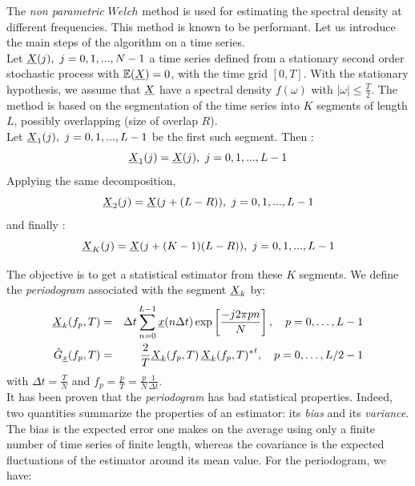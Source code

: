 The \emph{non parametric} $Welch$ method is used for estimating the spectral density at different frequencies. This method is known to be performant. Let us introduce the main steps of the algorithm on a time series. \\ 
Let ${\underline{X}}(j), \ j = 0, 1,...,N-1$ a time series defined from a stationary second order stochastic process with $\mathbb{E}({\underline{X}}) = 0$, with the time grid $[0, T]$.
With the stationary hypothesis, we assume that ${\underline{X}}$ have a spectral density $f(\omega)$ with $| \omega | \leq \frac{T}{2}$. 
The method is based on the segmentation of the time series into $K$ segments of length $L$, possibly overlapping (size of overlap $R$).\\
Let ${\underline{X}}_{1}(j), \ j = 0, 1,...,L-1$ be the first such segment. Then :
\begin{equation*}
{\underline{X}}_{1}(j) = {\underline{X}}(j) , \ j = 0, 1,...,L-1
\end{equation*}
Applying the same decomposition, 
\begin{equation*}
 {\underline{X}}_{2}(j) = {\underline{X}}(j + (L - R)) , \ j = 0, 1,...,L-1
\end{equation*}
and finally :
\begin{equation*}
 {\underline{X}}_{K}(j) = {\underline{X}}(j + (K-1)(L-R)) , \ j = 0, 1,...,L-1
\end{equation*}

The objective is to get a statistical estimator from these $K$ segments. We define the \emph{periodogram} associated with the segment ${\underline{X}}_k$ by:
\begin{eqnarray*}
  {\underline{X}}_{k}(f_p,T)&=&\Delta t\sum_{n=0}^{L-1}{\underline{x}}(n\Delta t)\exp\left[\frac{-j2\pi pn}{N}\right], \quad p=0,\dots, L-1\\
  \hat{G}_{{\underline{x}}}(f_p,T)&=&\frac{2}{T}{\underline{X}}_{k}(f_p,T)\,{{\underline{X}}_{k}(f_p,T)^*}^t,\quad p=0,\dots,L/2-1
\end{eqnarray*}
with $\Delta t=\frac{T}{N}$ and $f_p=\frac{p}{T}=\frac{p}{N}\frac{1}{\Delta t}$.\\

It has been proven that the \emph{periodogram} has bad statistical properties. Indeed, two quantities summarize the properties of an estimator: 
its \emph{bias} and its \emph{variance}. 
The bias is the expected error one makes on the average using only a finite number of time series of finite length, whereas the covariance is the expected fluctuations of 
the estimator around its mean value. For the periodogram, we have:

